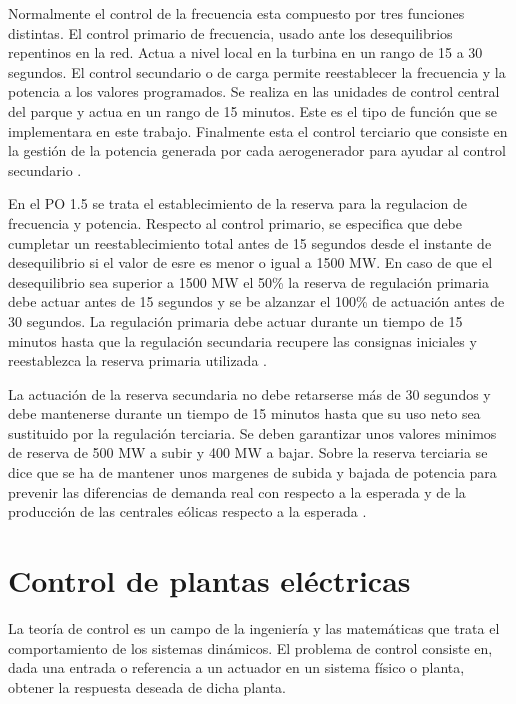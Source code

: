 \documentclass{book}
\begin{document}
Normalmente el control de la frecuencia esta compuesto por tres funciones distintas. El control primario de frecuencia, usado ante los desequilibrios repentinos en la red. Actua a nivel local en la turbina en un rango de 15 a 30 segundos. El control secundario o de carga permite reestablecer la frecuencia y la potencia a los valores programados. Se realiza en las unidades de control central del parque y actua en un rango de 15 minutos. Este es el tipo de funci\'on que se implementara en este trabajo. Finalmente esta el control terciario que consiste en la gesti\'on de la potencia generada por cada aerogenerador para ayudar al control secundario \cite{WFgridcode}. \par

En el PO 1.5 se trata el establecimiento de la reserva para la regulacion de frecuencia y potencia. Respecto al control primario, se especifica que debe cumpletar un reestablecimiento total antes de 15 segundos desde el instante de desequilibrio si el valor de esre es menor o igual a 1500 MW. En caso de que el desequilibrio sea superior a 1500 MW el 50\% la reserva de regulaci\'on primaria debe actuar antes de 15 segundos y se be alzanzar el 100\% de actuaci\'on antes de 30 segundos. La regulaci\'on primaria debe actuar durante un tiempo de 15 minutos hasta que la regulaci\'on secundaria recupere las consignas iniciales y reestablezca la reserva primaria utilizada \cite{PO15}. \par

La actuaci\'on de la reserva secundaria no debe retarserse m\'as de 30 segundos y debe mantenerse durante un tiempo de 15 minutos hasta que su uso neto sea sustituido por la regulaci\'on terciaria. Se deben garantizar unos valores minimos de reserva de 500 MW a subir y 400 MW a bajar. Sobre la reserva terciaria se dice que se ha de mantener unos margenes de subida y bajada de potencia para prevenir las diferencias de demanda real con respecto a la esperada y de la producci\'on de las centrales e\'olicas respecto a la esperada \cite{PO15}. \par

\chapter{Control de plantas el\'ectricas}

La teor\'ia de control es un campo de la ingenier\'ia y las matem\'aticas que trata el comportamiento de los sistemas din\'amicos. El problema de control consiste en, dada una entrada o referencia a un actuador en un sistema f\'isico o planta, obtener la respuesta deseada de dicha planta. \par
\end{document}
